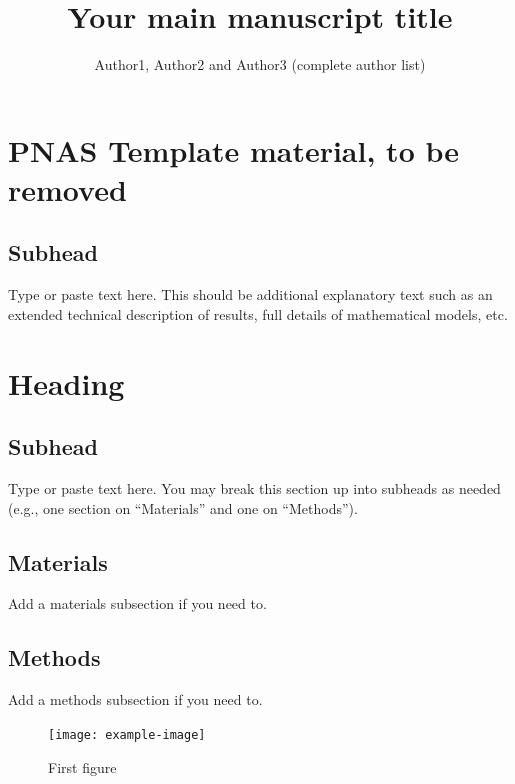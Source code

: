 \documentclass[9pt,twoside,lineno]{pnas-new}
\title{Your main manuscript title}
\author{Author1, Author2 and Author3 (complete author list)}
\begin{document}
\instructionspage  

\maketitle

\SItext


\section*{PNAS Template material, to be removed}

\subsection*{Subhead}
Type or paste text here. This should be additional explanatory text such as an extended technical description of results, full details of mathematical models, etc.   

\section*{Heading}
\subsection*{Subhead}
Type or paste text here. You may break this section up into subheads as needed (e.g., one section on ``Materials'' and one on ``Methods'').

\subsection*{Materials}
Add a materials subsection if you need to.

\subsection*{Methods}
Add a methods subsection if you need to.


\begin{figure}
\centering
\texttt{[image: example-image]}
\caption{First figure}
\end{figure}
\end{document}
